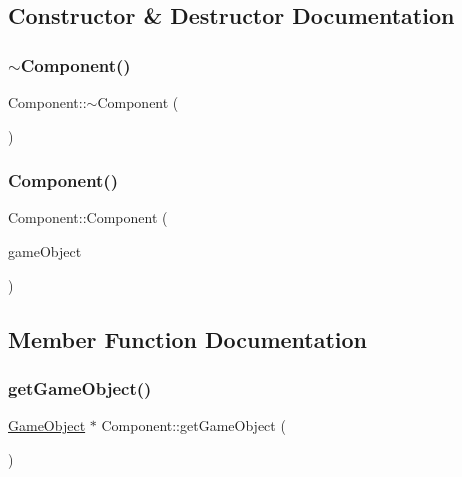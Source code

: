 \subsection{Constructor \& Destructor Documentation}
\hypertarget{class_mason_1_1_component_ab8378fa275af98e568a7e91d33d867af}{}\label{class_mason_1_1_component_ab8378fa275af98e568a7e91d33d867af} 
\subsubsection{\texorpdfstring{$\sim$\+Component()}{~Component()}}
{\footnotesize\ttfamily Component\+::$\sim$\+Component (\begin{DoxyParamCaption}{ }\end{DoxyParamCaption})\hspace{0.3cm}{\ttfamily [virtual]}}

\hypertarget{class_mason_1_1_component_a98d3a7d72f88dc7e67c946c78afb8243}{}\label{class_mason_1_1_component_a98d3a7d72f88dc7e67c946c78afb8243} 
\subsubsection{\texorpdfstring{Component()}{Component()}}
{\footnotesize\ttfamily Component\+::\+Component (\begin{DoxyParamCaption}\item[{\hyperlink{class_mason_1_1_game_object}{Game\+Object} $\ast$}]{game\+Object }\end{DoxyParamCaption})\hspace{0.3cm}{\ttfamily [protected]}}



\subsection{Member Function Documentation}
\hypertarget{class_mason_1_1_component_abed36db99f1ee0ba84a5fb8485e17428}{}\label{class_mason_1_1_component_abed36db99f1ee0ba84a5fb8485e17428} 
\subsubsection{\texorpdfstring{get\+Game\+Object()}{getGameObject()}}
{\footnotesize\ttfamily \hyperlink{class_mason_1_1_game_object}{Game\+Object} $\ast$ Component\+::get\+Game\+Object (\begin{DoxyParamCaption}{ }\end{DoxyParamCaption})}



